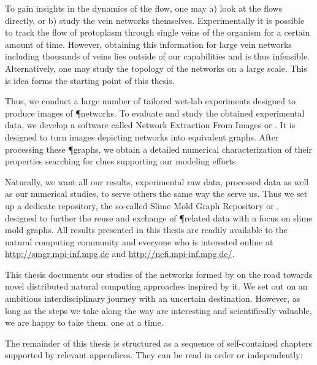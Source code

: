 	To gain insights in the dynamics of the flow, one may a) look at the flows directly, or b) study the vein networks themselves. Experimentally it is possible to track the flow of protoplasm through single veins of the organism for a certain amount of time. However, obtaining this information for large vein networks including thousands of veins lies outside of our capabilities and is thus infeasible. Alternatively, one may study the topology of the networks on a large scale. This is idea forms the starting point of this thesis. 

	Thus, we conduct a large number of tailored wet-lab experiments designed to produce images of \P networks. To evaluate and study the obtained experimental data, we develop a software called Network Extraction From Images or \NEFI. It is designed to turn images depicting networks into equivalent graphs. After processing these \P graphs, we obtain a detailed numerical characterization of their properties searching for clues supporting our modeling efforts. 

	Naturally, we want all our results, \ie experimental raw data, processed data as well as our numerical studies, to serve others the same way the serve us. Thus we set up a dedicate repository, the so-called Slime Mold Graph Repository or \SMGR, designed to further the reuse and exchange of \P related data with a focus on slime mold graphs. All results presented in this thesis are readily available to the natural computing community and everyone who is interested online at \href{http://smgr.mpi-inf.mpg.de}{http://smgr.mpi-inf.mpg.de} and \href{http://nefi.mpi-inf.mpg.de/}{http://nefi.mpi-inf.mpg.de/}.

	This thesis documents our studies of the networks formed by \Pp on the road towards novel distributed natural computing approaches inspired by it. We set out on an ambitious interdisciplinary journey with an uncertain destination. However, as long as the steps we take along the way are interesting and scientifically valuable, we are happy to take them, one at a time.

	\newpage
	The remainder of this thesis is structured as a sequence of self-contained chapters supported by relevant appendices. They can be read in order or independently:\vspace{\baselineskip}

